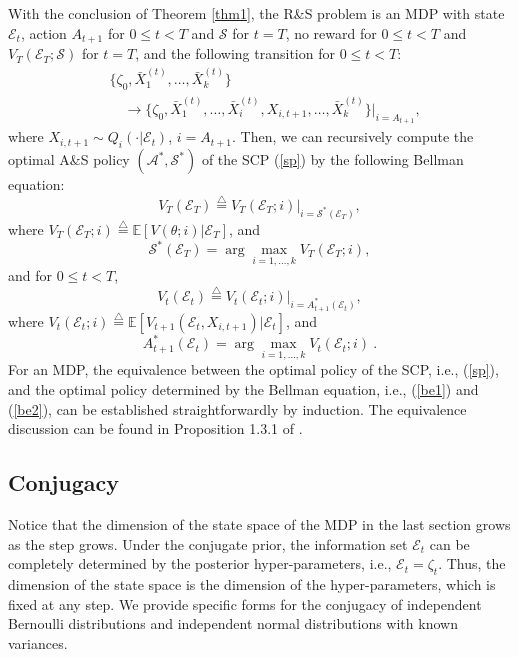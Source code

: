 \documentclass[journal]{IEEEtran}
\newcommand{\ed}{\stackrel{\triangle}{=}}
\begin{document}
  With the conclusion of Theorem \ref{thm1}, the R\&S problem is an MDP with state $\mathcal{E}_t$, action $A_{t+1}$ for $0\leq t<T$ and $\mathcal{S}$ for $t=T$, no reward for $0\leq t<T$ and $V_T(\mathcal{E}_T;\mathcal{S})$ for $t=T$, and the following transition for $0\leq t<T$:
  \begin{align*}&\{ \zeta_0, \bar{X}_1^{(t)},\ldots,\bar{X}_k^{(t)} \}
  \\
  &\quad\to \{ \zeta_0,  \bar{X}_1^{(t)},\ldots,\bar{X}_{i}^{(t)},X_{i,t+1},\ldots,\bar{X}_k^{(t)} \}|_{i=A_{t+1}},\end{align*}
  where $X_{i,t+1}\sim Q_{i}(\cdot|\mathcal{E}_t)$, $i=A_{t+1}$.
  Then, we can recursively compute the optimal A\&S policy $(\mathcal{A}^{*},\mathcal{S}^{*})$ of the SCP (\ref{sp}) by the following Bellman equation:
 \begin{equation}\label{be1}V_T(\mathcal{E}_T)\ed\left.V_T(\mathcal{E}_T; i)\right|_{i=\mathcal{S}^{*}(\mathcal{E}_T)},\end{equation}
  where $V_T(\mathcal{E}_T; i)\ed\mathbb{E}\left[ V(\theta;i)|\mathcal{E}_T \right]$, and 
   \begin{equation*}\label{osp}\mathcal{S}^{*}(\mathcal{E}_T)=\arg\max_{i=1,\ldots,k}V_T(\mathcal{E}_T; i),\end{equation*}
   and for $0\leq t<T$,
   \begin{equation}\label{be2}V_{t}(\mathcal{E}_{t})\ed\left.V_{t}(\mathcal{E}_{t};i )\right|_{i=A_{t+1}^{*}(\mathcal{E}_t)},\end{equation}
where $V_{t}(\mathcal{E}_{t};i)\ed\mathbb{E}\left[ V_{t+1}(\mathcal{E}_{t}, X_{i,t+1}) |\mathcal{E}_{t}\right]$, and 
\begin{equation*}\label{oap}A_{t+1}^{*}(\mathcal{E}_{t})=\arg\max_{i=1,\ldots,k}V_{t}(\mathcal{E}_{t};i)~.\end{equation*}
For an MDP, the equivalence between the optimal policy of the SCP, i.e., (\ref{sp}), and the optimal policy determined by the Bellman equation, i.e., (\ref{be1}) and (\ref{be2}), can be established straightforwardly by induction. The equivalence discussion can be found in Proposition 1.3.1 of \cite{bertsekas1995dynamic}.  
 \subsection{Conjugacy}\label{cj}
 Notice that the dimension of the state space of the MDP in the last section grows as the step grows. Under the conjugate prior, the  information set $\mathcal{E}_t$ can be completely determined by the posterior hyper-parameters, i.e.,
 $\mathcal{E}_t=\zeta_t$. Thus, the dimension of the state space is the dimension of the hyper-parameters, which is fixed at any step. 
 We provide specific forms for the conjugacy of independent Bernoulli distributions and independent normal distributions with known variances. \\
\end{document}
